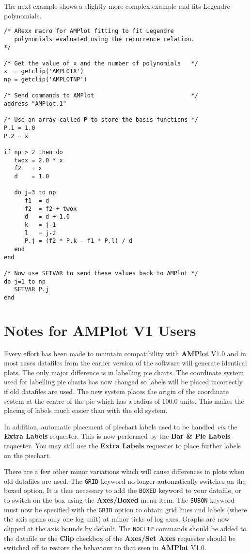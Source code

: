 The next example shows a slightly more complex example and fits Legendre polynomials.

\begin{verbatim}
/* ARexx macro for AMPlot fitting to fit Legendre 
   polynomials evaluated using the recurrence relation.
*/

/* Get the value of x and the number of polynomials   */
x  = getclip('AMPLOTX')
np = getclip('AMPLOTNP')

/* Send commands to AMPlot                            */
address "AMPlot.1"

/* Use an array called P to store the basis functions */
P.1 = 1.0
P.2 = x

if np > 2 then do
   twox = 2.0 * x
   f2   = x
   d    = 1.0
   
   do j=3 to np
      f1  = d
      f2  = f2 + twox
      d   = d + 1.0
      k   = j-1
      l   = j-2
      P.j = (f2 * P.k - f1 * P.l) / d
   end
end

/* Now use SETVAR to send these values back to AMPlot */
do j=1 to np
   SETVAR P.j
end
\end{verbatim}


\chapter{Notes for AMPlot V1 Users}
Every effort has been made to maintain compatibility with {\bf AMPlot} V1.0 and in
most cases datafiles from the earlier version of the software will generate 
identical plots. The only major difference is in labelling pie charts. The 
coordinate system used for labelling pie charts has now changed so labels will be 
placed incorrectly if old datafiles are used. The new system places the origin of 
the coordinate system at the centre of the pie which has a radius of 100.0 units. 
This makes the placing of labels much easier than with the old system.

In addition, automatic placement of piechart labels used to be handled {\em via\/}
the {\bf Extra Labels} requester. This is now performed by the {\bf Bar \& Pie Labels}
requester. You may still use the {\bf Extra Labels} requester to place further
labels on the piechart.

There are a few other minor variations which will cause differences in plots when
old datafiles are used.
The {\tt GRID} keyword no longer automatically switches on the boxed option. It is
thus necessary to add the {\tt BOXED} keyword to your datafile, or to switch on the
box using the {\bf Axes/Boxed} menu item.
The {\tt SUBON} keyword must now be specified with the {\tt GRID} option to obtain 
grid lines and labels (where the axis spans only one log unit) at minor ticks of 
log axes. Graphs are now clipped at the axis bounds by default. The {\tt NOCLIP} 
commands should be added to the datafile or the {\bf Clip} checkbox of the {\bf 
Axes/Set Axes} requester should be switched  off to restore the behaviour to that 
seen in {\bf AMPlot} V1.0.

